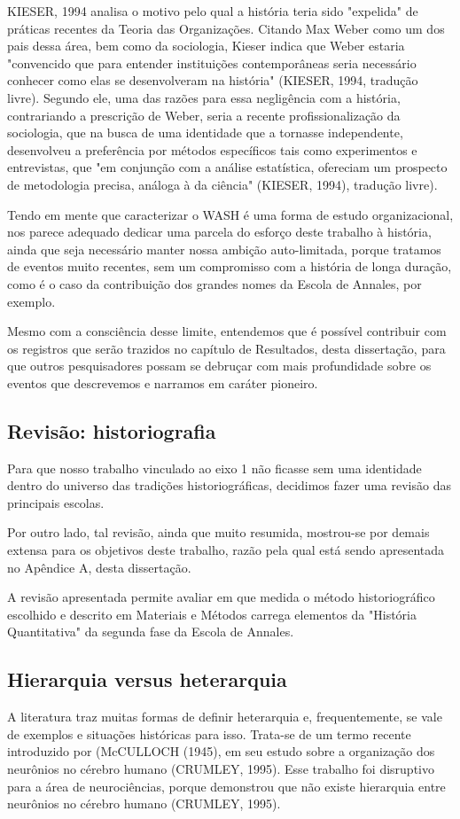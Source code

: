 KIESER, 1994  analisa o motivo pelo qual a história teria sido "expelida" de práticas recentes da Teoria das Organizações. Citando Max Weber como um dos pais dessa área, bem como da sociologia, Kieser indica que Weber estaria "convencido que para entender instituições contemporâneas seria necessário conhecer como elas se desenvolveram na história"  (KIESER, 1994, tradução livre). Segundo ele, uma das razões para essa negligência com a história, contrariando a prescrição de Weber, seria a recente profissionalização da sociologia, que na busca de uma identidade que a tornasse independente, desenvolveu a preferência por métodos específicos tais como experimentos e entrevistas, que "em conjunção com a análise estatística, ofereciam um prospecto de metodologia precisa, análoga à da ciência" (KIESER, 1994), tradução livre).

Tendo em mente que caracterizar o WASH é uma forma de estudo organizacional, nos parece adequado dedicar uma parcela do esforço deste trabalho à história, ainda que seja necessário manter nossa ambição auto-limitada, porque tratamos de eventos muito recentes, sem um compromisso com a história de longa duração, como é o caso da contribuição dos grandes nomes da Escola de Annales, por exemplo.

Mesmo com a consciência desse limite, entendemos que é possível contribuir com os registros que serão trazidos no capítulo de Resultados, desta dissertação, para que outros pesquisadores possam se debruçar com mais profundidade sobre os eventos que descrevemos e narramos em caráter pioneiro.

\subsection[Revisão: historiografia]{Revisão: historiografia}\label{Revisão: historiografia}
Para que nosso trabalho vinculado ao eixo 1 não ficasse sem uma identidade dentro do universo das tradições historiográficas, decidimos fazer uma revisão das principais escolas.

Por outro lado, tal revisão, ainda que muito resumida, mostrou-se por demais extensa para os objetivos deste trabalho, razão pela qual está sendo apresentada no Apêndice A, desta dissertação.

A revisão apresentada permite avaliar em que medida o método historiográfico escolhido e descrito em Materiais e Métodos carrega elementos da "História Quantitativa" da segunda fase da Escola de Annales.

\subsection[Hierarquia versus heterarquia]{Hierarquia versus heterarquia}\label{Hierarquia versus heterarquia}
A literatura traz muitas formas de definir heterarquia e, frequentemente, se vale de exemplos e situações históricas para isso. Trata-se de um termo  recente introduzido  por (McCULLOCH (1945), em seu estudo sobre a organização dos neurônios no cérebro humano (CRUMLEY, 1995). Esse trabalho foi disruptivo para a área de neurociências, porque demonstrou que não existe hierarquia entre neurônios no cérebro humano  (CRUMLEY, 1995).

